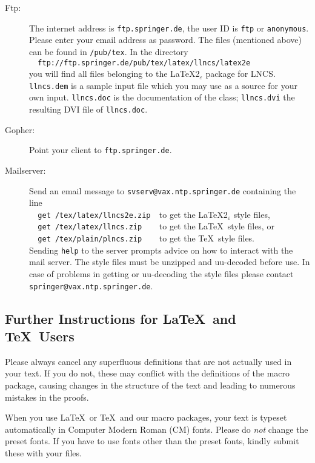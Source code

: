 \documentclass[runningheads]{llncs}
\begin{document}
\begin{description}
\item[Ftp:]
The internet address is \verb+ftp.springer.de+, the user ID is
\verb+ftp+ or \verb+anonymous+. Please enter your email address as
password. The files (mentioned above) can be found in \verb+/pub/tex+.
In the directory\\
\verb+  ftp://ftp.springer.de/pub/tex/latex/llncs/latex2e+\\
you will find all files belonging to the \LaTeX2$_\varepsilon$ package
for LNCS.
\verb+llncs.dem+ is a sample input file which you
may use as a source for your own input. \verb+llncs.doc+ is the
documentation of the class; \verb+llncs.dvi+ the resulting DVI file of
\verb+llncs.doc+.
\item[Gopher:]
Point your client to \verb+ftp.springer.de+.
\item[Mailserver:]
Send an email message to
\verb+svserv@vax.ntp.springer.de+  containing the line\\
\verb+  get /tex/latex/llncs2e.zip  +to get the
\LaTeX2$_\varepsilon$ style files,\\
\verb+  get /tex/latex/llncs.zip    +to get the \LaTeX\
style files, or\\
\verb+  get /tex/plain/plncs.zip    +to get the \TeX\
style files.\\
Sending \verb+help+ to the server prompts advice on how
to interact with the mail server. The style files must be unzipped and
uu-decoded before use. In case of problems in getting or uu-decoding the
style files please contact \verb+springer@vax.ntp.springer.de+.
\end{description}

\subsection{Further Instructions for \LaTeX\ and \TeX\ Users}

Please always cancel any superfluous definitions that are
not actually used in your text. If you do not, these may conflict with
the definitions of the macro package, causing changes in the structure
of the text and leading to numerous mistakes in the proofs.

When you use \LaTeX\ or \TeX\ and our macro packages, your text is
typeset automatically in Computer Modern Roman (CM) fonts. Please do
{\it not} change the preset fonts. If you have to use fonts other
than the preset fonts, kindly submit these with your files.
\end{document}
